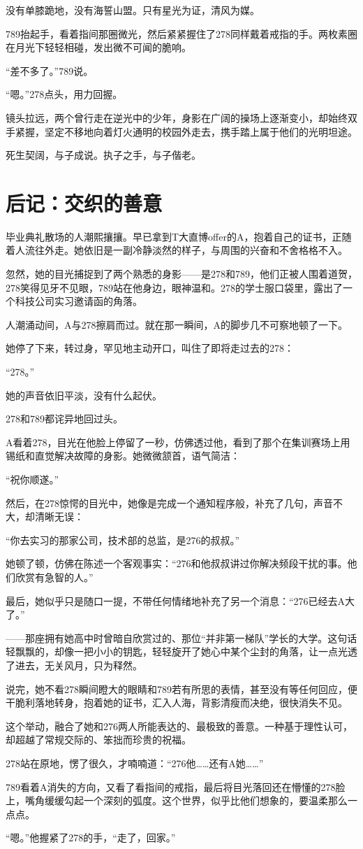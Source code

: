 \documentclass[a4paper]{book}
\begin{document}
没有单膝跪地，没有海誓山盟。只有星光为证，清风为媒。

789抬起手，看着指间那圈微光，然后紧紧握住了278同样戴着戒指的手。两枚素圈在月光下轻轻相碰，发出微不可闻的脆响。

“差不多了。”789说。

“嗯。”278点头，用力回握。

镜头拉远，两个曾行走在逆光中的少年，身影在广阔的操场上逐渐变小，却始终双手紧握，坚定不移地向着灯火通明的校园外走去，携手踏上属于他们的光明坦途。

死生契阔，与子成说。执子之手，与子偕老。
\newpage
\chapter*{后记：交织的善意}
\normalsize
\songti{}
毕业典礼散场的人潮熙攘攘。早已拿到T大直博offer的A，抱着自己的证书，正随着人流往外走。她依旧是一副冷静淡然的样子，与周围的兴奋和不舍格格不入。

忽然，她的目光捕捉到了两个熟悉的身影——是278和789，他们正被人围着道贺，278笑得见牙不见眼，789站在他身边，眼神温和。278的学士服口袋里，露出了一个科技公司实习邀请函的角落。

人潮涌动间，A与278擦肩而过。就在那一瞬间，A的脚步几不可察地顿了一下。

她停了下来，转过身，罕见地主动开口，叫住了即将走过去的278：

“278。”

她的声音依旧平淡，没有什么起伏。

278和789都诧异地回过头。

A看着278，目光在他脸上停留了一秒，仿佛透过他，看到了那个在集训赛场上用锡纸和直觉解决故障的身影。她微微颔首，语气简洁：

“祝你顺遂。”

然后，在278惊愕的目光中，她像是完成一个通知程序般，补充了几句，声音不大，却清晰无误：

“你去实习的那家公司，技术部的总监，是276的叔叔。”

她顿了顿，仿佛在陈述一个客观事实：“276和他叔叔讲过你解决频段干扰的事。他们欣赏有急智的人。”

最后，她似乎只是随口一提，不带任何情绪地补充了另一个消息：“276已经去A大了。”

——那座拥有她高中时曾暗自欣赏过的、那位“并非第一梯队”学长的大学。这句话轻飘飘的，却像一把小小的钥匙，轻轻旋开了她心中某个尘封的角落，让一点光透了进去，无关风月，只为释然。

说完，她不看278瞬间瞪大的眼睛和789若有所思的表情，甚至没有等任何回应，便干脆利落地转身，抱着她的证书，汇入人海，背影清瘦而决绝，很快消失不见。

这个举动，融合了她和276两人所能表达的、最极致的善意。一种基于理性认可，却超越了常规交际的、笨拙而珍贵的祝福。

278站在原地，愣了很久，才喃喃道：“276他……还有A她……”

789看着A消失的方向，又看了看指间的戒指，最后将目光落回还在懵懂的278脸上，嘴角缓缓勾起一个深刻的弧度。这个世界，似乎比他们想象的，要温柔那么一点点。

“嗯。”他握紧了278的手，“走了，回家。”
\end{document}
